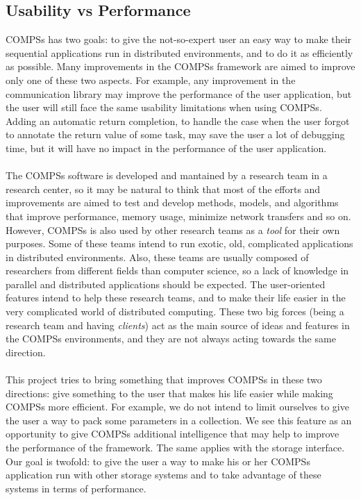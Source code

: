 \subsection{Usability vs Performance}
\label{subsec:compss_ux_vs_perf}
COMPSs has two goals: to give the not-so-expert user an easy way to make their sequential applications run in distributed environments, and to do it as efficiently as possible. Many improvements in the COMPSs framework are aimed to improve only one of these two aspects. For example, any improvement in the communication library may improve the performance of the user application, but the user will still face the same usability limitations when using COMPSs. Adding an automatic return completion, to handle the case when the user forgot to annotate the return value of some task, may save the user a lot of debugging time, but it will have no impact in the performance of the user application.\\
\\
The COMPSs software is developed and mantained by a research team in a research center, so it may be natural to think that most of the efforts and improvements are aimed to test and develop methods, models, and algorithms that improve performance, memory usage, minimize network transfers and so on. However, COMPSs is also used by other research teams as a \textit{tool} for their own purposes. Some of these teams intend to run exotic, old, complicated applications in distributed environments. Also, these teams are usually composed of researchers from different fields than computer science, so a lack of knowledge in parallel and distributed applications should be expected. The user-oriented features intend to help these research teams, and to make their life easier in the very complicated world of distributed computing. These two big forces (being a research team and having \textit{clients}) act as the main source of ideas and features in the COMPSs environments, and they are not always acting towards the same direction.\\
\\
This project tries to bring something that improves COMPSs in these two directions: give something to the user that makes his life easier while making COMPSs more efficient. For example, we do not intend to limit ourselves to give the user a way to pack some parameters in a collection. We see this feature as an opportunity to give COMPSs additional intelligence that may help to improve the performance of the framework. The same applies with the storage interface. Our goal is twofold: to give the user a way to make his or her COMPSs application run with other storage systems and to take advantage of these systems in terms of performance.
